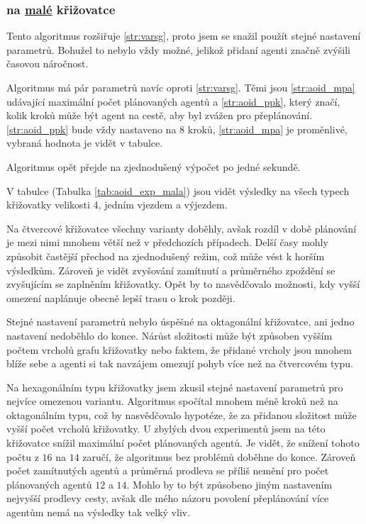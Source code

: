 \subsubsection{ na \hyperref[par:data_mala]{malé} křižovatce}
\label{subsubsec:exp_aoid_mala_krizovatka}

Tento algoritmus rozšiřuje \ref{str:varsg}, proto jsem se snažil použít stejné nastavení parametrů.
Bohužel to nebylo vždy možné, jelikož přidaní agenti značně zvýšili časovou náročnost.

Algoritmus má pár parametrů navíc oproti \ref{str:varsg}.
Těmi jsou \ref{str:aoid_mpa} udávající maximální počet plánovaných agentů
a \ref{str:aoid_ppk}, který značí, kolik kroků může být agent na cestě, aby byl zvážen pro přeplánování.
\ref{str:aoid_ppk} bude vždy nastaveno na $8$ kroků,
\ref{str:aoid_mpa} je proměnlivé, vybraná hodnota je vidět v tabulce.

Algoritmus opět přejde na zjednodušený výpočet po jedné sekundě.

V tabulce (Tabulka \ref{tab:aoid_exp_mala}) jsou vidět výsledky na všech typech křižovatky
velikosti 4, jedním vjezdem a výjezdem.

Na čtvercové křižovatce všechny varianty doběhly,
avšak rozdíl v době plánování je mezi nimi mnohem větší než v předchozích případech.
Delší časy mohly způsobit častější přechod na zjednodušený režim, což může vést k horším výsledkům.
Zároveň je vidět zvyšování zamítnutí a průměrného zpoždění se zvyšujícím se zaplněním křižovatky.
Opět by to nasvědčovalo možnosti, kdy vyšší omezení naplánuje obecně lepší trasu o krok později.

Stejné nastavení parametrů nebylo úspěšné na oktagonální křižovatce, ani jedno nastavení nedoběhlo do konce.
Nárůst složitosti může být způsoben vyšším počtem vrcholů grafu křižovatky
nebo faktem, že přidané vrcholy jsou mnohem blíže sebe
a agenti si tak navzájem omezují pohyb více než na čtvercovém typu.

Na hexagonálním typu křižovatky jsem zkusil stejné nastavení parametrů pro nejvíce omezenou variantu.
Algoritmus spočítal mnohem méně kroků než na oktagonálním typu, což by nasvědčovalo hypotéze,
že za přidanou složitost může vyšší počet vrcholů křižovatky.
U zbylých dvou experimentů jsem na této křižovatce snížil maximální počet plánovaných agentů.
Je vidět, že snížení tohoto počtu z $16$ na $14$ zaručí, že algoritmus bez problémů doběhne do konce.
Zároveň počet zamítnutých agentů a průměrná prodleva se příliš nemění pro počet plánovaných agentů $12$ a $14$.
Mohlo by to být způsobeno jiným nastavením nejvyšší prodlevy cesty,
avšak dle mého názoru povolení přeplánování více agentům nemá na výsledky tak velký vliv.

